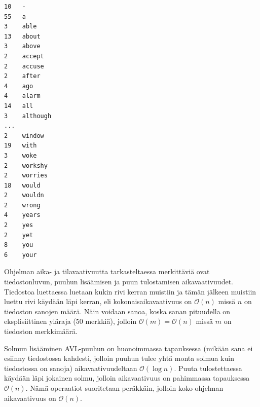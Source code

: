 \documentclass[12pt,a4paper,titlepage]{article}
\begin{document}
\begin{lstlisting}[float,
		label={output},
		caption={Output, kun sanalaskurille annetaan tiedosto \texttt{run/kafka.txt}},
		xleftmargin=6.5cm]
10   -                                                 
55   a                                                 
3    able                                              
13   about                                             
3    above                                             
2    accept                                            
2    accuse                                            
2    after                                             
4    ago                                               
4    alarm                                             
14   all                                               
3    although 
...
2    window                                            
19   with                                              
3    woke                                              
2    workshy                                           
2    worries                                           
18   would                                             
2    wouldn                                            
2    wrong                                             
4    years                                             
2    yes                                               
2    yet                                               
8    you                                               
6    your
\end{lstlisting}

Ohjelman aika- ja tilavaativuutta tarkasteltaessa merkittäviä ovat tiedostonluvun, puuhun lisäämisen ja puun tulostamisen aikavaativuudet. Tiedostoa luettaessa luetaan kukin rivi kerran muistiin ja tämän jälkeen muistiin luettu rivi käydään läpi kerran, eli kokonaisaikavaativuus on $\mathcal{O}(n)$ missä $n$ on tiedoston sanojen määrä. Näin voidaan sanoa, koska sanan pituudella on eksplisiittinen yläraja (50 merkkiä), jolloin $\mathcal{O}(m) = \mathcal{O}(n)$ missä $m$ on tiedoston merkkimäärä.

Solmun lisääminen AVL-puuhun on huonoimmassa tapauksessa (mikään sana ei esiinny tiedostossa kahdesti, jolloin puuhun tulee yhtä monta solmua kuin tiedostossa on sanoja) aikavaativuudeltaan $\mathcal{O}(\log{n})$. Puuta tulostettaessa käydään läpi jokainen solmu, jolloin aikavaativuus on pahimmassa tapauksessa $\mathcal{O}(n)$. Nämä operaatiot suoritetaan peräkkäin, jolloin koko ohjelman aikavaativuus on $\mathcal{O}(n)$. \cite{cormen}
\end{document}
